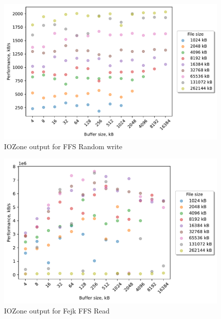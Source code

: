 \begin{figure}[!htb]
	\label{fig:bench_ffs_rnd_write}
	\begin{center}
		\includegraphics[width=1.0\textwidth]{figures/benchmarking/ffs/Random write.pdf}
	\end{center}
	\caption{IOZone output for FFS Random write}
\end{figure}

\begin{figure}[!htb]
	\label{fig:bench_fffs_read}
	\begin{center}
		\includegraphics[width=1.0\textwidth]{figures/benchmarking/fejk-ffs/Read.pdf}
	\end{center}
	\caption{IOZone output for Fejk FFS Read}
\end{figure}

